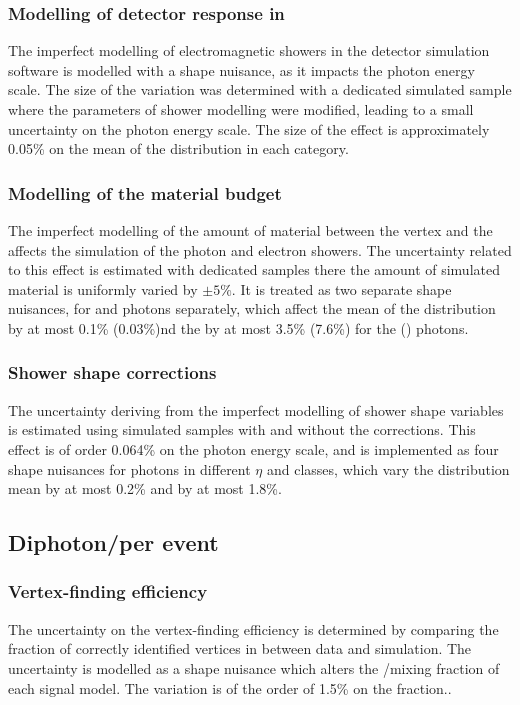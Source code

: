 \subsubsection{Modelling of detector response in \Geant}
The imperfect modelling of electromagnetic showers in the detector simulation software \Geant is modelled with a shape nuisance, as it impacts the photon energy scale. The size of the variation was determined with a dedicated simulated sample where the parameters of shower modelling were modified, leading to a small uncertainty on the photon energy scale. The size of the effect is approximately 0.05\% on the mean of the \mgg distribution in each category.

\subsubsection{Modelling of the material budget}
The imperfect modelling of the amount of material between the vertex and the \ECAL affects the simulation of the photon and electron showers. The uncertainty related to this effect is estimated with dedicated samples there the amount of simulated material is uniformly varied by $\pm 5\%$. It is treated as two separate shape nuisances, for \EB and \EE photons separately, which affect the mean of the \mgg distribution by at most 0.1\% (0.03\%)nd the \effSigma by at most 3.5\% (7.6\%) for the \EB (\EE) photons.

\subsubsection{Shower shape corrections}
The uncertainty deriving from the imperfect modelling of shower shape variables is estimated using simulated samples with and without the corrections. This effect is of order 0.064\% on the photon energy scale, and is implemented as four shape nuisances for photons in different $\eta$ and \RNINE classes, which vary the \mgg distribution mean by at most 0.2\% and \effSigma by at most 1.8\%.

\subsection{Diphoton/per event}

\subsubsection{Vertex-finding efficiency}
The uncertainty on the vertex-finding efficiency is determined by comparing the fraction of correctly identified vertices in \Zmumu between data and simulation. The uncertainty is modelled as a shape nuisance which alters the \RV/\WV mixing fraction of each signal model. The variation is of the order of 1.5\% on the \RV fraction..

